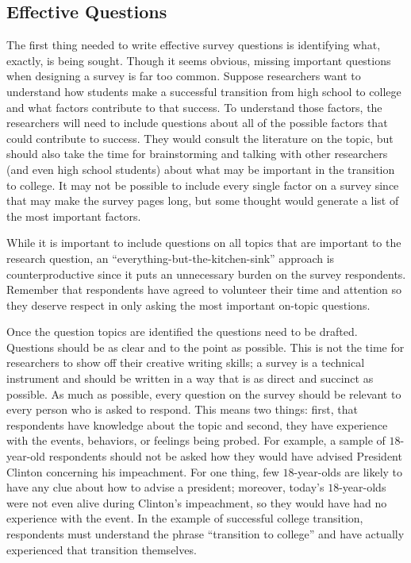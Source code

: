 \subsection{Effective Questions}

The first thing needed to write effective survey questions is identifying what, exactly, is being sought. Though it seems obvious, missing important questions when designing a survey is far too common. Suppose researchers want to understand how students make a successful transition from high school to college and what factors contribute to that success. To understand those factors, the researchers will need to include questions about all of the possible factors that could contribute to success. They would consult the literature on the topic, but should also take the time for brainstorming and talking with other researchers (and even high school students) about what may be important in the transition to college. It may not be possible to include every single factor on a survey since that may make the survey pages long, but some thought would generate a list of the most important factors.

While it is important to include questions on all topics that are important to the research question, an ``everything-but-the-kitchen-sink'' approach is counterproductive since it puts an unnecessary burden on the survey respondents. Remember that respondents have agreed to volunteer their time and attention so they deserve respect in only asking the most important on-topic questions.

Once the question topics are identified the questions need to be drafted. Questions should be as clear and to the point as possible. This is not the time for researchers to show off their creative writing skills; a survey is a technical instrument and should be written in a way that is as direct and succinct as possible. As much as possible, every question on the survey should be relevant to every person who is asked to respond. This means two things: first, that respondents have knowledge about the topic and second, they have experience with the events, behaviors, or feelings being probed. For example, a sample of $ 18 $-year-old respondents should not be asked how they would have advised President Clinton concerning his impeachment. For one thing, few $ 18 $-year-olds are likely to have any clue about how to advise a president; moreover, today's $ 18 $-year-olds were not even alive during Clinton's impeachment, so they would have had no experience with the event. In the example of successful college transition, respondents must understand the phrase ``transition to college'' and have actually experienced that transition themselves.

